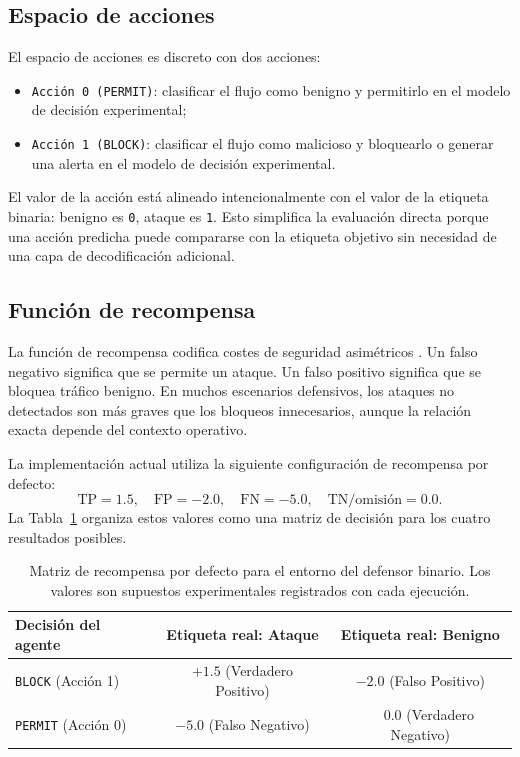 \subsection{Espacio de acciones}
El espacio de acciones es discreto con dos acciones:
\begin{itemize}
    \item \texttt{Acción 0 (PERMIT)}: clasificar el flujo como benigno y permitirlo en el modelo de decisión experimental;
    \item \texttt{Acción 1 (BLOCK)}: clasificar el flujo como malicioso y bloquearlo o generar una alerta en el modelo de decisión experimental.
\end{itemize}

El valor de la acción está alineado intencionalmente con el valor de la etiqueta binaria: benigno es \texttt{0}, ataque es \texttt{1}. Esto simplifica la evaluación directa porque una acción predicha puede compararse con la etiqueta objetivo sin necesidad de una capa de decodificación adicional.

\subsection{Función de recompensa}
La función de recompensa codifica costes de seguridad asimétricos \parencite{Lee2002CostSensitiveIDS,Cardenas2006IDSFramework}. Un falso negativo significa que se permite un ataque. Un falso positivo significa que se bloquea tráfico benigno. En muchos escenarios defensivos, los ataques no detectados son más graves que los bloqueos innecesarios, aunque la relación exacta depende del contexto operativo.

La implementación actual utiliza la siguiente configuración de recompensa por defecto:
\[
\text{TP}=1.5,\quad \text{FP}=-2.0,\quad \text{FN}=-5.0,\quad \text{TN/omisión}=0.0.
\]
La Tabla~\ref{tab:reward-matrix} organiza estos valores como una matriz de decisión para los cuatro resultados posibles.

\begin{table}[htbp]
\centering
\begin{tabular}{lcc}
\toprule
Decisión del agente & Etiqueta real: Ataque & Etiqueta real: Benigno \\
\midrule
\texttt{BLOCK} (Acción 1) & $+1.5$ (Verdadero Positivo) & $-2.0$ (Falso Positivo) \\
\texttt{PERMIT} (Acción 0) & $-5.0$ (Falso Negativo) & $\phantom{-}0.0$ (Verdadero Negativo) \\
\bottomrule
\end{tabular}
\caption[Matriz de recompensa del entorno del defensor binario]{Matriz de recompensa por defecto para el entorno del defensor binario. Los valores son supuestos experimentales registrados con cada ejecución.}
\label{tab:reward-matrix}
\end{table}

